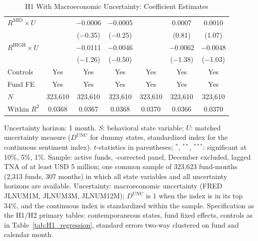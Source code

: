 \begin{table}[!htbp]
{\begin{tabular}{lcccccc}
$R^{\text{MID}}\times U$ &  & $-$0.0006 & $-$0.0005 &  & 0.0007 & 0.0010 \\
 &  & ($-$0.35) & ($-$0.25) &  & (0.81) & (1.07) \\[2pt]
$R^{\text{HIGH}}\times U$ &  & $-$0.0111 & $-$0.0046 &  & $-$0.0062 & $-$0.0048 \\
 &  & ($-$1.26) & ($-$0.50) &  & ($-$1.38) & ($-$1.03) \\[2pt]
\midrule
Controls & Yes & Yes & Yes & Yes & Yes & Yes \\
Fund FE & Yes & Yes & Yes & Yes & Yes & Yes \\
$N$ & 323,610 & 323,610 & 323,610 & 323,610 & 323,610 & 323,610 \\
Within $R^2$ & 0.0368 & 0.0367 & 0.0368 & 0.0370 & 0.0366 & 0.0370 \\
\bottomrule
\end{tabular}%
}\sbefit
\setlength{\tabletempwidth}{\wd\tabletempbox}
\ifdim\tabletempwidth>\linewidth\setlength{\tabletempwidth}{\linewidth}\fi
\begin{minipage}{\tabletempwidth}
\captionsetup{width=\linewidth}
\caption{H1 With Macroeconomic Uncertainty: Coefficient Estimates}\label{tab:unc_H1}
\ifdim\wd\tabletempbox>\linewidth
  \resizebox{\linewidth}{!}{\usebox{\tabletempbox}}
\else
  \usebox{\tabletempbox}
\fi
\par\medskip
\begin{singlespace}\tablefont\noindent
Uncertainty horizon: 1 month. $S$: behavioral state variable; $U$: matched uncertainty measure ($D^{\text{UNC}}$ for dummy states, standardized index for the continuous sentiment index). $t$-statistics in parentheses; $^{*}$, $^{**}$, $^{***}$: significant at 10\%, 5\%, 1\%. Sample: active funds, \textcite{Evans2010}-corrected panel, December excluded, lagged TNA of at least USD 5 million; one common sample of 323,623 fund-months (2,313 funds, 307 months) in which all state variables and all uncertainty horizons are available. Uncertainty: \textcite{JuradoLudvigsonNg2015} macroeconomic uncertainty (FRED JLNUM1M, JLNUM3M, JLNUM12M); $D^{\text{UNC}}$ is 1 when the index is in its top 34\%, and the continuous index is standardized within the sample. Specification as the H1/H2 primary tables: contemporaneous states, fund fixed effects, controls as in Table~\ref{tab:H1_regression}, standard errors two-way clustered on fund and calendar month.
\end{singlespace}
\end{minipage}
\end{table}

